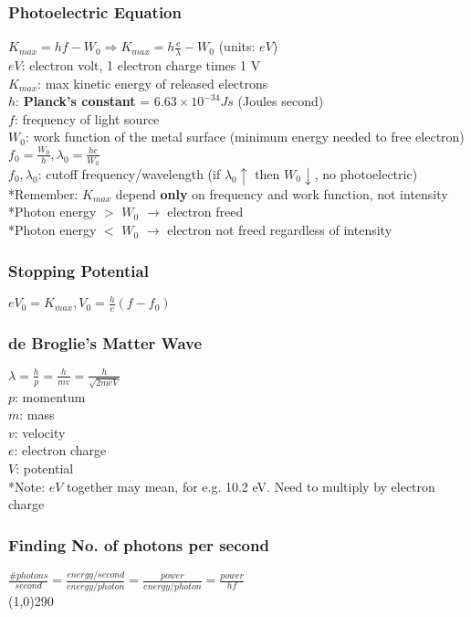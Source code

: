 \documentclass[10 pt]{article}
\begin{document}
\begin{multicols}{2}
\subsubsection*{Photoelectric Equation}
$K_{max} = hf - W_0 \Rightarrow K_{max} = h\frac{c}{\lambda} - W_0$ (units: $eV$) \\
$eV$: electron volt, 1 electron charge times 1 V \\
$K_{max}$: max kinetic energy of released electrons \\
$h$: \textbf{Planck's constant} = $6.63 \times 10^{-34} J s$ (Joules second)\\
$f$: frequency of light source \\
$W_0$: work function of the metal surface (minimum energy needed to free electron) \\
$f_0 = \frac{W_0}{h}, \lambda_0 = \frac{hc}{W_0}$ \\
$f_0, \lambda_0$: cutoff frequency/wavelength (if $\lambda_0 \uparrow$ then $W_0\downarrow$, no photoelectric) \\
*Remember: $K_{max}$ depend \textbf{only} on frequency and work function, not intensity \\
*Photon energy $>$ $W_0$ $\rightarrow$ electron freed \\
*Photon energy $<$ $W_0$ $\rightarrow$ electron not freed regardless of intensity
\subsubsection*{Stopping Potential}
$eV_0 = K_{max}, V_0 = \frac{h}{e}(f - f_0)$
\subsubsection*{de Broglie's Matter Wave}
$\lambda = \frac{h}{p} = \frac{h}{mv} = \frac{h}{\sqrt{2meV}}$ \\
$p$: momentum \\
$m$: mass \\
$v$: velocity \\
$e$: electron charge \\
$V$: potential \\
*Note: $eV$ together may mean, for e.g. 10.2 eV. Need to multiply by electron charge
\subsubsection*{Finding No. of photons per second}
$\frac{\#photons}{second} = \frac{energy/second}{energy/photon} = \frac{power}{energy/photon} = \frac{power}{hf}$ \\
\line(1,0){290}


\end{multicols}
\end{document}
